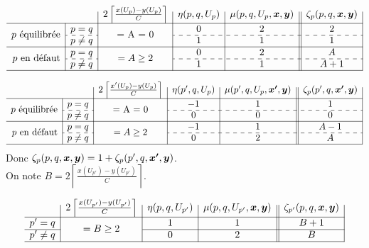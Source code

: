 \begin{gather*}
  \begin{array}{r|c|c|c|c||c|}
    \multicolumn{2}{c|}{}
    & 2 \left\lceil \frac{x(U_p)-y(U_p)}{C} \right\rceil
    & \eta(p,q,U_p)
    & \mu(p,q,U_p,\bs{x},\bs{y})
    & \zeta_p(p,q,\bs{x},\bs{y})
    \\ \hline
    \multirow{2}{*}{$p$ équilibrée}
    & p=q
    & \multirow{2}{*}{= A = 0}
    & 0
    & 2
    & 2
    \\ \cdashline{2-2}\cdashline{4-6}
    & p \ne q
    &
    & 1
    & 1
    & 1
    \\ \hline
    \multirow{2}{*}{$p$ en défaut}
    & p=q
    & \multirow{2}{*}{$= A \ge 2$}
    & 0
    & 2
    & A
    \\ \cdashline{2-2}\cdashline{4-6}
    & p \ne q
    &
    & 1
    & 1
    & A + 1
    \\ \hline
  \end{array}
\end{gather*}

\begin{gather*}
  \begin{array}{r|c|c|c|c||c|}
    \multicolumn{2}{c|}{}
    & 2 \left\lceil \frac{x'(U_p)-y(U_p)}{C} \right\rceil
    & \eta(p',q,U_p)
    & \mu(p',q,U_p,\bs{x'},\bs{y})
    & \zeta_p(p',q,\bs{x'},\bs{y})
    \\ \hline
    \multirow{2}{*}{$p$ équilibrée}
    & p=q
    & \multirow{2}{*}{= A = 0}
    & -1
    & 1
    & 1
    \\ \cdashline{2-2}\cdashline{4-6}
    & p \ne q
    &
    & 0
    & 0
    & 0
    \\ \hline
    \multirow{2}{*}{$p$ en défaut}
    & p=q
    & \multirow{2}{*}{$= A \ge 2$}
    & -1
    & 1
    & A-1
    \\ \cdashline{2-2}\cdashline{4-6}
    & p \ne q
    &
    & 0
    & 2
    & A
    \\ \hline
  \end{array}
\end{gather*}
Donc $\zeta_p(p,q,\boldsymbol{x},\boldsymbol{y}) = 1 + \zeta_p(p',q,\boldsymbol{x'},\boldsymbol{y})$.
\\

On note $B = 2 \left\lceil \frac{\displaystyle x(U_{p'})-y(U_{p'})}{\displaystyle C} \right\rceil$.

\begin{gather*}
  \begin{array}{r|c|c|c||c|}
    & 2 \left\lceil \frac{x(U_{p'})-y(U_{p'})}{C} \right\rceil
    & \eta(p,q,U_{p'})
    & \mu(p,q,U_{p'},\bs{x},\bs{y})
    & \zeta_{p'}(p,q,\bs{x},\bs{y})
    \\ \hline
    p' = q
    & \multirow{2}{*}{$= B \ge 2$}
    & 1
    & 1
    & B + 1
    \\ \cline{1-1}\cline{3-5}
    p' \ne q
    &
    & 0
    & 2
    & B
    \\ \hline
  \end{array}
\end{gather*}

